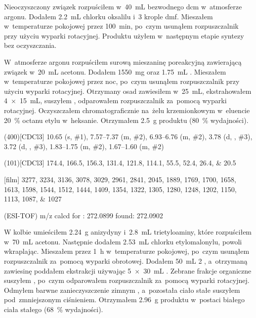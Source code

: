 Nieoczyszczony związek  rozpuściłem w~\SI{40}{\mL}
  bezwodnego \gls{dcm} w~atmosferze argonu. Dodałem \SI{2.2}{\mL} chlorku oksalilu
  i~\num{3} krople \gls{dmf}.
Mieszałem w~temperaturze pokojowej przez \SI{100}{\minute}, po~czym usunąłem rozpuszczalnik
  przy użyciu wyparki rotacyjnej.
Produktu użyłem w~następnym etapie syntezy bez oczyszczania.

W~atmosferze argonu rozpuściłem surową mieszaninę poreakcyjną zawierającą związek
   w~\SI{20}{\mL} acetonu.
Dodałem \SI{1550}{\milli\gram}  oraz \SI{1.75}{\mL} .
Mieszałem w~temperaturze pokojowej przez noc, po~czym usunąłem rozpuszczalnik przy użyciu
  wyparki rotacyjnej.
Otrzymany osad zawiesiłem w~\SI{25}{\mL},
  ekstrahowałem \SI[product-units = single]{4 x 15}{\mL},
  suszyłem , odparowałem rozpuszczalnik za~pomocą wyparki rotacyjnej.
Oczyszczałem chromatograficznie na~żelu krzemionkowym w~eluencie \SI{20}{\percent} octanu
  etylu w~heksanie.
Otrzymałem \SI{2.5}{\gram} produktu (\SI{80}{\percent} wydajności).

\begin{fullexp}
  \NMR(400)[CDCl3] \num{10.65} (s, \#{1}), \numrange{7.57}{7.37} (m, \#{2}), \numrange{6.93}{6.76} (m, \#{2}), \num{3.78} (d, , \#{3}), \num{3.72} (d, , \#{3}), \numrange{1.83}{1.75} (m, \#{2}), \numrange{1.67}{1.60} (m, \#{2})\par\noindent
  (101)[CDCl3] \numlist{174.4; 166.5; 156.3; 131.4; 121.8; 114.1; 55.5; 52.4; 26.4; 20.5}\par\noindent
  [film] \numlist{3277; 3234; 3136; 3078; 3029; 2961; 2841; 2045; 1889; 1769; 1700; 1658; 1613; 1598; 1544; 1512; 1444; 1409; 1354; 1322; 1305; 1280; 1248; 1202; 1150; 1113; 1087; 1027}\par\noindent
   (ESI-TOF) m/z calcd for : \num{272.0899} found: \num{272.0902}
\end{fullexp}

W kolbie umieściłem \SI{2.24}{\gram} anizydyny i~\SI{2.8}{\mL} trietyloaminy,
  które rozpuściłem w~\SI{70}{\mL} acetonu.
Następnie dodałem \SI{2.53}{\mL} chlorku etylomalonylu, powoli wkraplając.
Mieszałem przez \SI{1}{\hour} w~temperaturze pokojowej, po~czym usunąłem rozpuszczalnik
  za~pomocą wyparki obrotowej.
Dodałem \SI{50}{\mL} \SI{2}{\Molar} , a~otrzymaną zawiesinę poddałem ekstrakcji
  używając \SI[product-units = single]{5 x 30}{\mL} .
Zebrane frakcje organiczne suszyłem , po~czym odparowałem rozpuszczalnik za~pomocą
  wyparki rotacyjnej.
Odmyłem barwne zanieczyszczenie zimnym ,
  a~pozostała ciało stałe suszyłem pod~zmniejszonym ciśnieniem.
Otrzymałem \SI{2.96}{\gram} produktu w~postaci białego ciała stałego (\SI{68}{\percent} wydajności).

